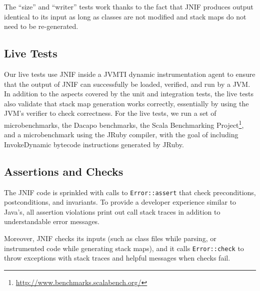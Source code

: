 The ``size'' and ``writer'' tests work thanks to the fact that 
JNIF produces output identical to its input 
as long as classes are not modified and stack maps do not need to be re-generated.

%



\subsection*{Live Tests}

Our live tests use JNIF inside a JVMTI dynamic instrumentation agent
to ensure that the output of JNIF can successfully be loaded, verified, and run by a JVM.
In addition to the aspects covered by the unit and integration tests,
the live tests also validate that stack map generation works correctly,
essentially by using the JVM's verifier to check correctness.
%
For the live tests, we run a set of microbenchmarks, 
the Dacapo benchmarks, 
the Scala Benchmarking Project\footnote{\url{http://www.benchmarks.scalabench.org/}},
and a microbenchmark using the JRuby compiler,
with the goal of including InvokeDynamic bytecode instructions generated by JRuby.




\subsection*{Assertions and Checks}

The JNIF code is sprinkled with calls to \texttt{Error::assert} 
that check preconditions, postconditions, and invariants.
To provide a developer experience similar to Java's,
all assertion violations print out call stack traces in addition to understandable error messages.

Moreover, JNIF checks its inputs (such as class files while parsing, or instrumented code while generating stack maps),
and it calls \texttt{Error::check} to throw exceptions with stack traces and helpful messages
when checks fail. 

